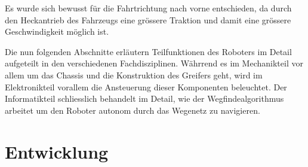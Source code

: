 \documentclass[main.tex]{subfiles} %
\begin{document}
Es wurde sich bewusst für die Fahrtrichtung nach vorne entschieden, da durch
den Heckantrieb des Fahrzeugs eine grössere Traktion und damit eine grössere
Geschwindigkeit möglich ist.


Die nun folgenden Abschnitte erläutern Teilfunktionen des Roboters im Detail
aufgeteilt in den verschiedenen Fachdisziplinen. Währrend es im Mechanikteil
vor allem um das Chassis und die Konstruktion des Greifers geht, wird im
Elektronikteil vorallem die Ansteuerung dieser Komponenten beleuchtet. Der
Informatikteil schliesslich behandelt im Detail, wie der Wegfindealgorithmus
arbeitet um den Roboter autonom durch das Wegenetz zu navigieren.

\section{Entwicklung}


\newpage


\newpage


\newpage
\end{document}
